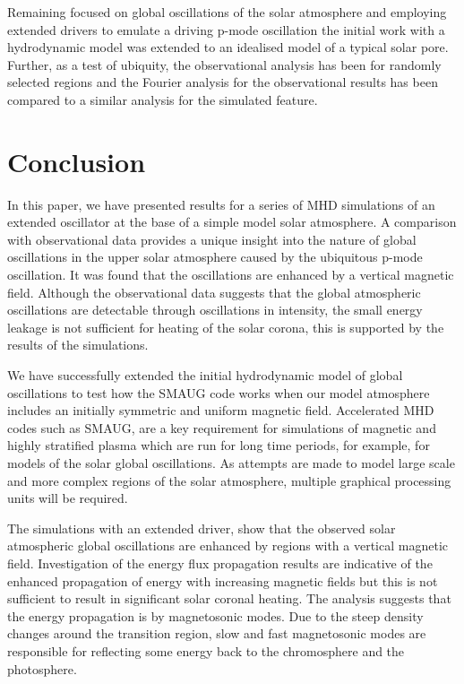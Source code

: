 \documentclass[physics,article,submit,pdftex,moreauthors]{Definitions/mdpi}
\begin{document}
 



Remaining focused on global oscillations of the solar atmosphere and employing extended drivers to emulate a driving p-mode oscillation the initial work with a hydrodynamic model was extended to an idealised model of a typical solar pore. Further, as a test of ubiquity, the observational analysis has been for randomly selected regions and the Fourier analysis for the observational results has been compared to a similar analysis for the simulated feature.  








\section{Conclusion}

In this paper, we have presented results for a series of MHD simulations of an extended oscillator at the base of a simple model solar atmosphere. A comparison with observational data provides a unique insight into the nature of  global oscillations in the upper solar atmosphere caused by the ubiquitous p-mode oscillation. It was found that the oscillations are enhanced by a vertical magnetic field. Although the observational data suggests that the global atmospheric oscillations are detectable through oscillations in intensity, the small energy leakage is not sufficient for heating of the solar corona, this is supported by the results of the simulations.

We  have successfully extended the initial hydrodynamic model of global oscillations to test how the SMAUG \cite{Griffiths2015} code works when our model atmosphere includes an initially symmetric and uniform magnetic field. Accelerated MHD codes such as SMAUG, are a key requirement for simulations of magnetic and highly stratified plasma which are run for long time periods, for example, for models of the solar global oscillations. As attempts are made to model large scale and more complex regions of the solar atmosphere, multiple graphical processing units will be required.

The simulations with an extended driver, show that the observed  solar atmospheric global oscillations are enhanced by regions with a vertical magnetic field. Investigation of the energy flux propagation results are indicative of the enhanced propagation of energy with increasing magnetic fields but this is not sufficient to result in significant solar coronal heating. The analysis suggests that the energy propagation is by magnetosonic modes. Due to the steep density changes around the transition region, slow and fast magnetosonic modes are responsible for reflecting some energy back to the chromosphere and the photosphere.  
\end{document}
